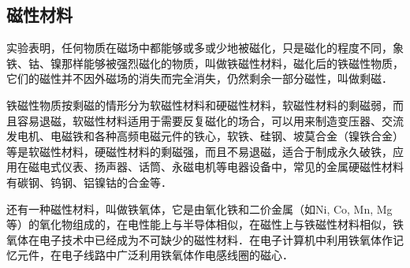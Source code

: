 \subsection{磁性材料}

实验表明，任何物质在磁场中都能够或多或少地被磁化，只是磁化的程度不同，象铁、钴、镍那样能够被强烈磁化的物质，叫做铁磁性材料，磁化后的铁磁性物质，它们的磁性并不因外磁场的消失而完全消失，仍然剩余一部分磁性，叫做剩磁．

铁磁性物质按剩磁的情形分为软磁性材料和硬磁性材料，软磁性材料的剩磁弱，而且容易退磁，软磁性材料适用于需要反复磁化的场合，可以用来制造变压器、交流发电机、电磁铁和各种高频电磁元件的铁心，软铁、硅钢、坡莫合金（镍铁合金）等是软磁性材料，硬磁性材料的剩磁强，而且不易退磁，适合于制成永久破铁，应用在磁电式仪表、扬声器、话筒、永磁电机等电器设备中，常见的金属硬磁性材料有碳钢、钨钢、铝镍钴的合金等．

还有一种磁性材料，叫做铁氧体，它是由氧化铁和二价金属（如Ni, Co, Mn, Mg等）的氧化物组成的，在电性能上与半导体相似，在磁性上与铁磁性材料相似，铁氧体在电子技术中已经成为不可缺少的磁性材料．在电子计算机中利用铁氧体作记忆元件，在电子线路中广泛利用铁氧体作电感线圈的磁心．

